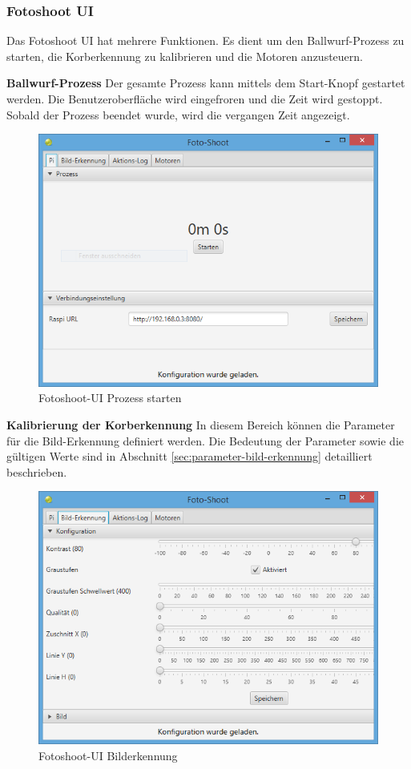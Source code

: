 \subsubsection{Fotoshoot UI}

Das Fotoshoot UI hat mehrere Funktionen. Es dient um den Ballwurf-Prozess zu starten, die Korberkennung zu kalibrieren und die Motoren anzusteuern.

\noindent
\textbf{Ballwurf-Prozess}
Der gesamte Prozess kann mittels dem Start-Knopf gestartet werden. Die Benutzeroberfläche wird eingefroren und die Zeit wird gestoppt. Sobald der Prozess beendet wurde, wird die vergangen Zeit angezeigt.

\begin{figure}[h!]
\centering
\includegraphics[width=0.7\linewidth]{../../fig/fotoshoot-ui/fotoshoot-ui-pi}
\caption{Fotoshoot-UI Prozess starten}
\label{fig:fotoshoot-ui-pi}
\end{figure}

\noindent
\textbf{Kalibrierung der Korberkennung}
In diesem Bereich können die Parameter für die Bild-Erkennung definiert werden. Die Bedeutung der Parameter sowie die gültigen Werte sind in Abschnitt \ref{sec:parameter-bild-erkennung} detailliert beschrieben.

\begin{figure}[h!]
	\centering
	\includegraphics[width=0.7\linewidth]{../../fig/fotoshoot-ui/fotoshoot-ui-korb-erkennung}
	\caption{Fotoshoot-UI Bilderkennung}
	\label{fig:fotoshoot-ui-korb-erkennung}
\end{figure}

